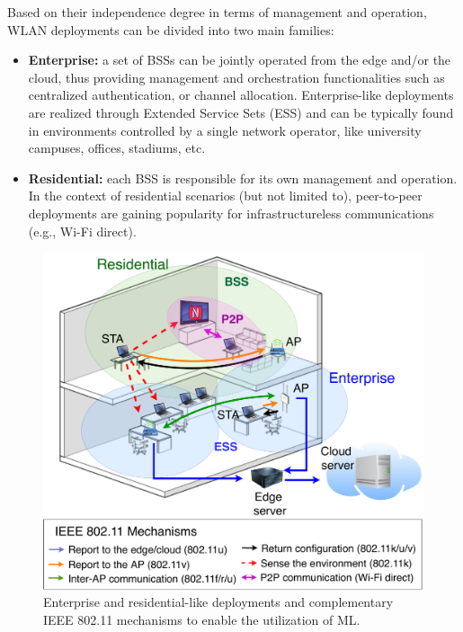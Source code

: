 \documentclass{article}
\begin{document}
Based on their independence degree in terms of management and operation, WLAN deployments can be divided into two main families:
\begin{itemize}
	\item \textbf{Enterprise:} a set of BSSs can be jointly operated from the edge and/or the cloud, thus providing management and orchestration functionalities such as centralized authentication, or channel allocation. Enterprise-like deployments are realized through Extended Service Sets (ESS) and can be typically found in environments controlled by a single network operator, like university campuses, offices, stadiums, etc. 
	\item \textbf{Residential:} each BSS is responsible for its own management and operation. In the context of residential scenarios (but not limited to), peer-to-peer deployments are gaining popularity for infrastructureless communications (e.g., Wi-Fi direct).
\end{itemize}

\begin{figure}[ht!]
	\centering
	\includegraphics[width=.8\columnwidth]{overview_learning_approaches}
	\caption{Enterprise and residential-like deployments and complementary IEEE 802.11 mechanisms to enable the utilization of ML.}
	\label{fig:overview_learning_approaches}
\end{figure}
\end{document}
